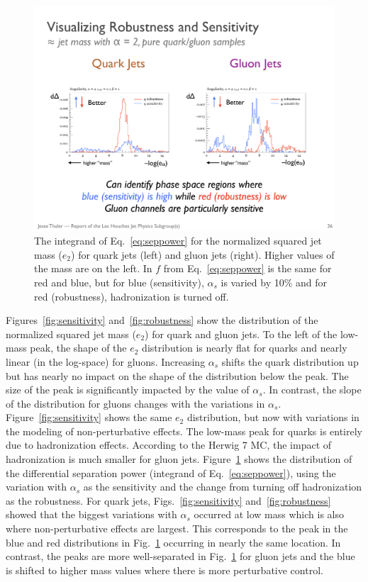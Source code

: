 \begin{figure}[h!]
\begin{center}
\includegraphics[width = 0.99\columnwidth]{figures/differentialseparation.pdf}
\end{center}
\caption{The integrand of Eq.~\ref{eq:seppower} for the normalized squared jet mass ($e_2$) for quark jets (left) and gluon jets (right).  Higher values of the mass are on the left.  In $f$ from Eq.~\ref{eq:seppower} is the same for red and blue, but for blue (sensitivity), $\alpha_s$ is varied by 10\% and for red (robustness), hadronization is turned off.}
\label{fig:differentialseparation}
\end{figure}

Figures~\ref{fig:sensitivity} and~\ref{fig:robustness} show the distribution of the normalized squared jet mass ($e_2$) for quark and gluon jets.  To the left of the low-mass peak, the shape of the $e_2$ distribution is nearly flat for quarks and nearly linear (in the log-space) for gluons.  Increasing $\alpha_s$ shifts the quark distribution up but has nearly no impact on the shape of the distribution below the peak.  The size of the peak is significantly impacted by the value of $\alpha_s$.  In contrast, the slope of the distribution for gluons changes with the variations in $\alpha_s$.  Figure~\ref{fig:sensitivity} shows the same $e_2$ distribution, but now with variations in the modeling of non-perturbative effects.  The low-mass peak for quarks is entirely due to hadronization effects.  According to the Herwig 7 MC, the impact of hadronization is much smaller for gluon jets.  Figure~\ref{fig:differentialseparation} shows the distribution of the differential separation power (integrand of Eq.~\ref{eq:seppower}), using the variation with $\alpha_s$ as the sensitivity and the change from turning off hadronization as the robustness.  For quark jets, Figs.~\ref{fig:sensitivity} and~\ref{fig:robustness} showed that the biggest variations with $\alpha_s$ occurred at low mass which is also where non-perturbative effects are largest.  This corresponds to the peak in the blue and red distributions in Fig.~\ref{fig:differentialseparation} occurring in nearly the same location.  In contrast, the peaks are more well-separated in Fig.~\ref{fig:differentialseparation} for gluon jets and the blue is shifted to higher mass values where there is more perturbative control.  

